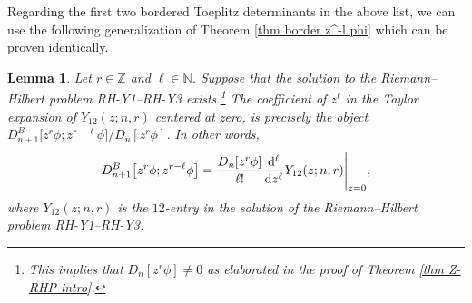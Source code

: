 \documentclass[10pt,a4paper]{amsart}
\numberwithin{equation}{section}
\newtheorem{Lemma}[Theorem]{Lemma}
 { \theoremstyle{definition}
\newtheorem{Definition}[Theorem]{Definition}
\newtheorem{Example}[Theorem]{Example}
\newtheorem{Remark}[Theorem]{Remark}
\newtheorem{Question}[Theorem]{Question}
}
\newcommand{\Z}{{\mathbb Z}}
\newcommand{\N}{{\mathbb N}}
\newcommand{\dd}{{\rm d}}
\begin{document}
		Regarding the first two bordered Toeplitz determinants in the above list, we can use the following generalization of Theorem \ref{thm border z^-l phi} which can be proven identically.
		
		\begin{Lemma}
			Let $r \in \Z$ and $\ell \in \N$. Suppose that the solution to the Riemann--Hilbert problem {\rm RH-Y1}--{\rm RH-Y3} exists.\footnote{This implies that $D_n[z^r\phi]\neq 0$ as elaborated in the proof of Theorem \ref{thm Z-RHP intro}.} The coefficient of $z^{\ell}$ in the Taylor expansion of $Y_{12}(z;n,r)$ centered at zero, is precisely the object $D^B_{n+1}\big[z^r\phi;z^{r-\ell}\phi\big]/D_n[z^r\phi]$. In other words,
			\begin{equation*}
				D^B_{n+1}\big[z^{r}\phi;z^{r-\ell}\phi\big] = \frac{D_n[z^{r}\phi]}{\ell!} \frac{\dd ^{\ell}}{\dd z^{\ell}}Y_{12}(z;n,r) \Bigg|_{z=0},
			\end{equation*}
			where $Y_{12}(z;n,r)$ is the $12$-entry in the solution of the Riemann--Hilbert problem {\rm RH-Y1}--{\rm RH-Y3}.
		\end{Lemma}
		
\end{document}
